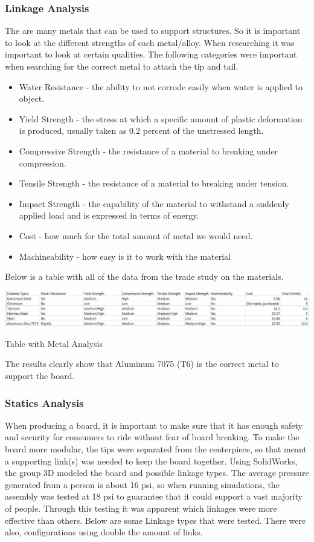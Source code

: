 \documentclass[letterpaper,12pt]{article}
\begin{document}
\subsubsection{Linkage Analysis}
The are many metals that can be used to support structures. So it is important to look at the different strengths of each metal/alloy. When researching it was important to look at certain qualities. The following categories were important when searching for the correct metal to attach the tip and tail.
\begin{itemize}
\item Water Resistance - the ability to not corrode easily when water is applied to object.
\item Yield Strength - the stress at which a specific amount of plastic deformation is produced, usually taken as 0.2 percent of the unstressed length.
\item Compressive Strength - the resistance of a material to breaking under compression.
\item Tensile Strength - the resistance of a material to breaking under tension.
\item Impact Strength - the capability of the material to withstand a suddenly applied load and is expressed in terms of energy.
\item Cost - how much for the total amount of metal we would need.
\item Machineability - how easy is it to work with the material
\end{itemize}
Below is a table with all of the data from the trade study on the materials.
\begin{table}[!htbp]\centering
  \includegraphics[width=\linewidth]{metals.JPG}
  \caption{Table with Metal Analysis}
  \label{metals}
\end{table}
\newline
The results clearly show that Aluminum 7075 (T6) is the correct metal to support the board.

\subsubsection{Statics Analysis}
When producing a board, it is important to make sure that it has enough safety and security for consumers to ride without fear of board breaking. To make the board more modular, the tips were separated from the centerpiece, so that meant a supporting link(s) was needed to keep the board together. Using SolidWorks, the group 3D modeled the board and possible linkage types. The average pressure generated from a person is about 16 psi, so when running simulations, the assembly was tested at 18 psi to guarantee that it could support a vast majority of people. Through this testing it was apparent which linkages were more effective than others.
\newline
Below are some Linkage types that were tested. There were also, configurations using double the amount of links.
\end{document}
